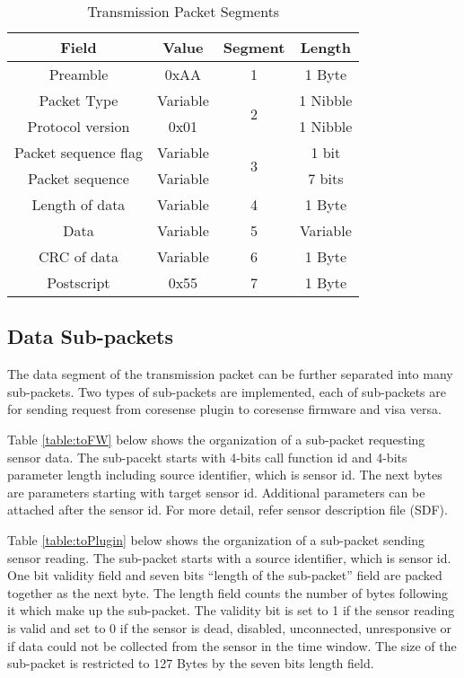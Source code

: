 \begin{table}[H]
    \centering
    {
    \begin{tabular}{|c|c|c|c|}
        \hline
        \rowcolor{black!8}
        \textbf{Field} & \textbf{Value} & \textbf{Segment} & \textbf{Length}\\
        \hline
        Preamble & 0xAA & 1 & 1 Byte\\ \hline
        Packet Type & Variable & \multirow{2}{*}{2} & 1 Nibble\\ \cline{1-2} \cline{4-4}
        Protocol version & 0x01 &  & 1 Nibble\\ \hline
        Packet sequence flag & Variable & \multirow{2}{*}{3} & 1 bit \\ \cline{1-2} \cline{4-4}
        Packet sequence & Variable &  & 7 bits \\ \hline
        Length of data & Variable & 4 & 1 Byte\\ \hline
        Data & Variable & 5 & Variable \\ \hline
        CRC of data & Variable & 6 & 1 Byte\\ \hline
        Postscript & 0x55 & 7 & 1 Byte\\ \hline
    \end{tabular}
    }
    \caption{Transmission Packet Segments}
    \label{table:seg}
\end{table}


\subsection{Data Sub-packets} \label{ssec:sub-pack}

The data segment of the transmission packet can be further separated into many sub-packets.
Two types of sub-packets are implemented, each of sub-packets are for sending request from coresense plugin to coresense firmware and visa versa.

Table \ref{table:toFW} below shows the organization of a sub-packet requesting sensor data.
The sub-pacekt starts with 4-bits call function id and 4-bits parameter length including source identifier, which is sensor id. The next bytes are parameters starting with target sensor id. Additional parameters can be attached after the sensor id. For more detail, refer sensor description file (SDF).

Table \ref{table:toPlugin} below shows the organization of a sub-packet sending sensor reading.
The sub-packet starts with a source identifier, which is sensor id. One bit validity field and seven bits ``length of the sub-packet'' field are packed together as the next byte. The length field counts the number of bytes following it which make up the sub-packet. 
The validity bit is set to 1 if the sensor reading is valid and set to 0 if the sensor is dead, disabled, unconnected, unresponsive or if data could not be collected
from the sensor in the time window. The size of the sub-packet is restricted to 127 Bytes by the seven bits length field.
\\



